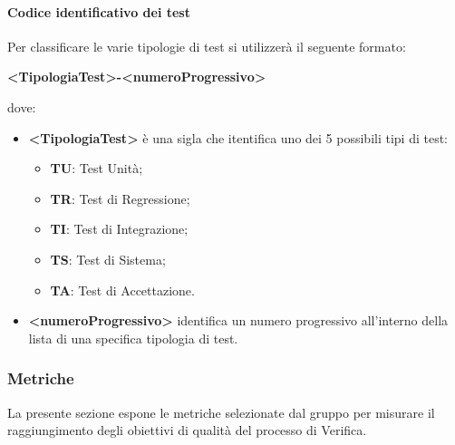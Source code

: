 				\paragraph{Codice identificativo dei test}
					Per classificare le varie tipologie di test si utilizzerà il seguente formato:
					\begin{center}
						\textbf{<TipologiaTest>-<numeroProgressivo>}
					\end{center}
					dove:
					\begin{itemize}
						\item\textbf{<TipologiaTest> } è una sigla che itentifica uno dei 5 possibili tipi di test:
							\begin{itemize}
								\item\textbf{TU}: Test Unità;
								\item\textbf{TR}: Test di Regressione;
								\item\textbf{TI}: Test di Integrazione;
								\item\textbf{TS}: Test di Sistema;
								\item\textbf{TA}: Test di Accettazione.
							\end{itemize}
						\item\textbf{<numeroProgressivo>} identifica un numero progressivo all’interno della lista di una specifica tipologia di test.
					\end{itemize}
\iffalse
		\subsubsection{Metriche}
			La presente sezione espone le metriche selezionate dal gruppo per misurare il raggiungimento degli obiettivi di qualità del processo di Verifica.

